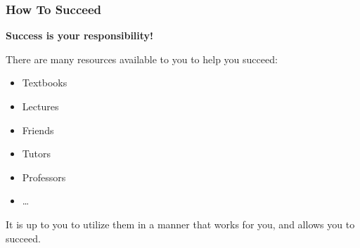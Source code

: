 \documentclass[10pt]{beamer}
\begin{document}
\begin{frame}[t]
\frametitle{How To Succeed}
\vspace{0.5cm}

	\begin{center}
		\textbf{Success is your responsibility!}
	\end{center}
	
	There are many resources available to you to help you succeed:
		\begin{itemize}
			\item Textbooks
			\item Lectures
			\item Friends
			\item Tutors
			\item Professors
			\item \ldots
		\end{itemize}
	
	\vspace{0.25cm}
	
	It is up to you to utilize them in a manner that works for you, and allows you to succeed.	
\end{frame}
\end{document}
